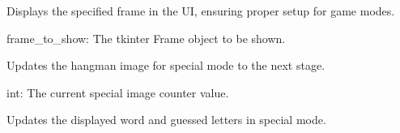 \documentclass[letterpaper,10pt,english]{sphinxmanual}
\begin{document}
\begin{fulllineitems}
\begin{fulllineitems}
\begin{description}
\end{description}

\end{fulllineitems}


\begin{fulllineitems}
\label{\detokenize{modules:GUI.HangmanGUI.show_frame}}
\pysigstartsignatures
{}
\pysigstopsignatures
\sphinxAtStartPar
Displays the specified frame in the UI, ensuring proper setup for game modes.
\begin{description}
\sphinxAtStartPar
frame\_to\_show: The tkinter Frame object to be shown.

\end{description}

\end{fulllineitems}


\begin{fulllineitems}
\label{\detokenize{modules:GUI.HangmanGUI.special_next_image}}
\pysigstartsignatures
{}
\pysigstopsignatures
\sphinxAtStartPar
Updates the hangman image for special mode to the next stage.
\begin{description}
\sphinxAtStartPar
int: The current special image counter value.

\end{description}

\end{fulllineitems}


\begin{fulllineitems}
\label{\detokenize{modules:GUI.HangmanGUI.special_update_word}}
\pysigstartsignatures
{}
\pysigstopsignatures
\sphinxAtStartPar
Updates the displayed word and guessed letters in special mode.

\end{fulllineitems}


\end{fulllineitems}
\end{document}
